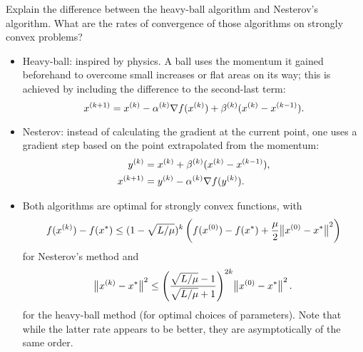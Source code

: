 \documentclass{article}
\begin{document}
\begin{question}
  Explain the difference between the heavy-ball algorithm and Nesterov’s algorithm.  What are the
  rates of convergence of those algorithms on strongly convex problems?
\end{question}
\begin{itemize}
\item Heavy-ball: inspired by physics.  A ball uses the momentum it gained beforehand to overcome
  small increases or flat areas on its way; this is achieved by including the difference to the
  second-last term:
  \begin{equation*}
    \kth[k+1]{x} = \kth{x} - \kth{\alpha} \nabla f(\kth{x}) + \kth{\beta}(\kth{x} - \kth[k-1]{x}).
  \end{equation*}
\item Nesterov: instead of calculating the gradient at the current point, one uses a gradient step
  based on the point extrapolated from the momentum:
  \begin{align*}
    \kth{y} &= \kth{x} + \kth{\beta}(\kth{x} - \kth[k-1]{x}), \\
    \kth[k+1]{x} &= \kth{y} - \kth{\alpha} \nabla f(\kth{y}).
  \end{align*}
\item Both algorithms are optimal for strongly convex functions, with
    \begin{equation*}
    f(\kth{x}) - f(x^*) \leq (1 - \sqrt{L/\mu})^k
    \left( f(\kth[0]{x}) - f(x^*) + \frac{\mu}{2} \enVert[1]{\kth[0]{x} - x^*}^2 \right)
  \end{equation*}
  for Nesterov's method and
  \begin{equation*}
    \enVert[1]{\kth{x} - x^*}^2 \leq
    \left( \frac{\sqrt{L/\mu} - 1}{\sqrt{L/\mu} + 1} \right)^{2k} \enVert[1]{\kth[0]{x} - x^*}^2.
  \end{equation*}
  for the heavy-ball method (for optimal choices of parameters).  Note that while the latter rate
  appears to be better, they are asymptotically of the same order.
\end{itemize}
\end{document}
